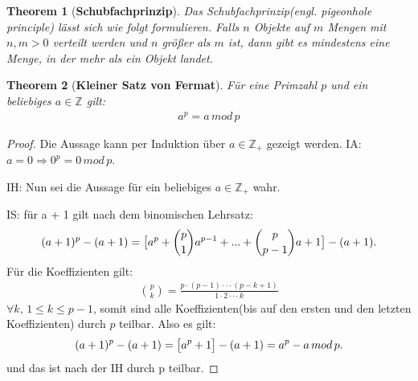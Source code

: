 \documentclass[12pt,oneside]{article}
\newtheorem{theorem}{Theorem}[section]
\theoremstyle{remark}
\theoremstyle{definition}
\begin{document}
\smallskip

\begin{theorem}[\textbf{Schubfachprinzip}]\label{pigeonhole} Das Schubfachprinzip(engl. pigeonhole principle) lässt sich wie folgt formulieren.
Falls $n$ Objekte auf $m$ Mengen mit $n,m > 0$ verteilt werden und $n$ größer als $m$ ist, dann gibt es mindestens eine Menge, in der mehr als ein Objekt landet. 

\end{theorem}

\smallskip

\begin{theorem}[\textbf{Kleiner Satz von Fermat}]\label{Th_2}
Für eine Primzahl $p$ und ein beliebiges $a \in \mathbb{Z}$ gilt:
\begin{align*}
    a^p = a \, mod \, p
\end{align*}
\end{theorem}

\begin{proof}
Die Aussage kann per Induktion über $a \in \mathbb{Z}_{+}$ gezeigt werden.\newline\newline
IA: $a = 0  \Rightarrow 0^p = 0 \, mod \, p$.\newline\newline

IH: Nun sei die Aussage für ein beliebiges $a \in \mathbb{Z}_{+}$ wahr.\newline\newline

IS: für a + 1 gilt nach dem binomischen Lehrsatz:
\begin{align*}
    (a + 1)^p - (a + 1) = \big{[}a^p + {p \choose 1}a^{p - 1} + ... +{p \choose p - 1} a + 1\big{]} - (a + 1).
\end{align*}
Für die Koeffizienten gilt: 
\begin{align*}
    {p \choose k} = \frac{p \cdot (p - 1) \cdot \cdot \cdot (p - k + 1)}{1 \cdot 2 \cdot \cdot \cdot k}
\end{align*}
$\forall k, \,  1 \leq k \leq p - 1$, somit sind alle Koeffizienten(bis auf den ersten und den letzten Koeffizienten) durch $p$ teilbar.\newline\newline
Also es gilt:
\begin{align*}
(a + 1)^p - (a + 1) = \big{[} a^p + 1 \big{]} - (a + 1) = a^p - a \, mod \, p.
\end{align*}
und das ist nach der IH durch p teilbar.\newline  
\end{proof}
\end{document}
